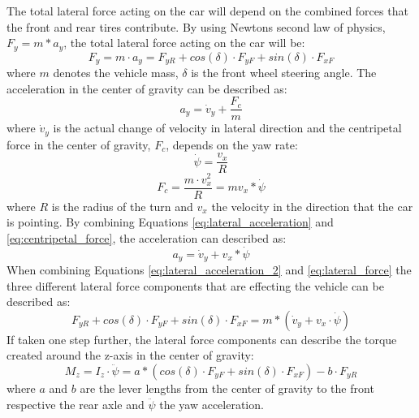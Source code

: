 The total lateral force acting on the car will depend on the combined forces that the front and rear tires contribute. By using Newtons second law of physics, $ F_{y} = m*a_{y} $, the total lateral force acting on the car will be:
\begin{equation} \label{eq:lateral_force}
	F_{y} = m \cdot a_{y} = F_{yR} + cos(\delta) \cdot F_{yF} + sin(\delta) \cdot F_{xF} 
\end{equation}
where $ m $ denotes the vehicle mass, $ \delta $ is the front wheel steering angle. The acceleration in the center of gravity can be described as: 
\begin{equation} \label{eq:lateral_acceleration}
	a_{y} = \dot v_{y} + \dfrac{F_{c}}{m}
\end{equation}
where $ \dot v_{y} $ is the actual change of velocity in lateral direction and the centripetal force in the center of gravity, $ F_{c} $, depends on the yaw rate:
\begin{equation} \label{eq:yaw_rate}
	\dot \psi = \dfrac{v_{x}}{R}
\end{equation}
\begin{equation} \label{eq:centripetal_force}
	F_{c} = \dfrac{m \cdot v^2_{x}}{R} = mv_{x}*\dot \psi
\end{equation}
where $ R $ is the radius of the turn and $ v_{x} $ the velocity in the direction that the car is pointing. By combining Equations \ref{eq:lateral_acceleration} and \ref{eq:centripetal_force}, the acceleration can described as:
\begin{equation} \label{eq:lateral_acceleration_2}
	a_{y} = \dot v_{y} + v_{x}*\dot \psi
\end{equation}
When combining Equations \ref{eq:lateral_acceleration_2} and \ref{eq:lateral_force} the three different lateral force components that are effecting the vehicle can be described as:
\begin{equation} \label{lateral_forces_2}
	F_{yR} + cos(\delta) \cdot F_{yF} + sin(\delta) \cdot F_{xF} = m*(\dot v_{y} + v_{x} \cdot \dot \psi)
\end{equation}
If taken one step further, the lateral force components can describe the torque created around the z-axis in the center of gravity: 
\begin{equation} \label{yaw_bicycle}
	M_{z} = I_{z} \cdot \ddot \psi = a*(cos(\delta) \cdot F_{yF} + sin(\delta) \cdot F_{xF}) - b \cdot F_{yR}
\end{equation}
where $ a $ and $ b $ are the lever lengths from the center of gravity to the front respective the rear axle and $ \ddot \psi $ the yaw acceleration. 

